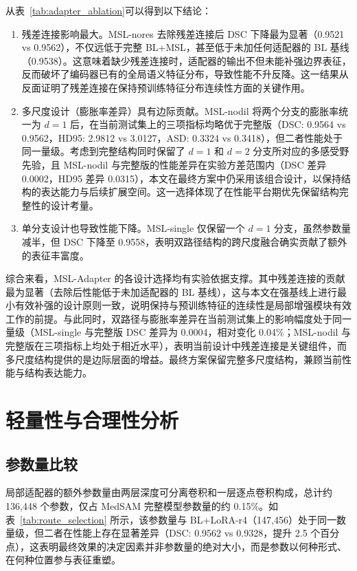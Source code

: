 从表~\ref{tab:adapter_ablation}可以得到以下结论：

\begin{enumerate}
  \item 残差连接影响最大。MSL-nores 去除残差连接后 DSC 下降最为显著（0.9521 vs 0.9562），不仅远低于完整 BL+MSL，甚至低于未加任何适配器的 BL 基线（0.9538）。这意味着缺少残差连接时，适配器的输出不但未能补强边界表征，反而破坏了编码器已有的全局语义特征分布，导致性能不升反降。这一结果从反面证明了残差连接在保持预训练特征分布连续性方面的关键作用。
  \item 多尺度设计（膨胀率差异）具有边际贡献。MSL-nodil 将两个分支的膨胀率统一为 $d=1$ 后，在当前测试集上的三项指标均略优于完整版（DSC: 0.9564 vs 0.9562，HD95: 2.9812 vs 3.0127，ASD: 0.3324 vs 0.3418），但二者性能处于同一量级。考虑到完整结构同时保留了 $d=1$ 和 $d=2$ 分支所对应的多感受野先验，且 MSL-nodil 与完整版的性能差异在实验方差范围内（DSC 差异 0.0002，HD95 差异 0.0315），本文在最终方案中仍采用该组合设计，以保持结构的表达能力与后续扩展空间。这一选择体现了在性能平台期优先保留结构完整性的设计考量。
  \item 单分支设计也导致性能下降。MSL-single 仅保留一个 $d=1$ 分支，虽然参数量减半，但 DSC 下降至 0.9558，表明双路径结构的跨尺度融合确实贡献了额外的表征丰富度。
\end{enumerate}

综合来看，MSL-Adapter 的各设计选择均有实验依据支撑。其中残差连接的贡献最为显著（去除后性能低于未加适配器的 BL 基线），这与本文在强基线上进行最小有效补强的设计原则一致，说明保持与预训练特征的连续性是局部增强模块有效工作的前提。与此同时，双路径与膨胀率差异在当前测试集上的影响幅度处于同一量级（MSL-single 与完整版 DSC 差异为 0.0004，相对变化 0.04\%；MSL-nodil 与完整版在三项指标上均处于相近水平），表明当前设计中残差连接是关键组件，而多尺度结构提供的是边际层面的增益。最终方案保留完整多尺度结构，兼顾当前性能与结构表达能力。

\section{轻量性与合理性分析}

\subsection{参数量比较}

局部适配器的额外参数量由两层深度可分离卷积和一层逐点卷积构成，总计约 136,448 个参数，仅占 MedSAM 完整模型参数量的约 0.15\%。如表~\ref{tab:route_selection} 所示，该参数量与 BL+LoRA-r4（147,456）处于同一数量级，但二者在性能上存在显著差异（DSC: 0.9562 vs 0.9328，提升 2.5 个百分点），这表明最终效果的决定因素并非参数量的绝对大小，而是参数以何种形式、在何种位置参与表征重塑。

